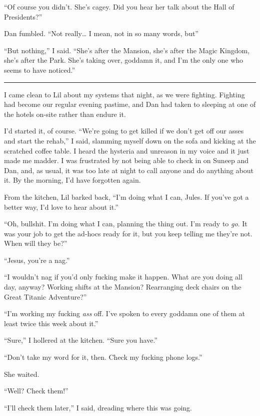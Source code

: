 “Of course you didn't. She's cagey. Did you hear her talk about the
Hall of Presidents?”

Dan fumbled. “Not really… I mean, not in so many words, but{\dash}”

“But nothing,” I said. “She's after the Mansion, she's after the
Magic Kingdom, she's after the Park. She's taking over, goddamn it,
and I'm the only one who seems to have noticed.”

\begin{center}\rule{1in}{0.4pt}\end{center}

I came clean to Lil about my systems that night, as we were
fighting. Fighting had become our regular evening pastime, and Dan
had taken to sleeping at one of the hotels on-site rather than
endure it.

I'd started it, of course. “We're going to get killed if we don't
get off our asses and start the rehab,” I said, slamming myself
down on the sofa and kicking at the scratched coffee table. I heard
the hysteria and unreason in my voice and it just made me madder. I
was frustrated by not being able to check in on Suneep and Dan,
and, as usual, it was too late at night to call anyone and do
anything about it. By the morning, I'd have forgotten again.

From the kitchen, Lil barked back, “I'm doing what I can, Jules. If
you've got a better way, I'd love to hear about it.”

“Oh, bullshit. I'm doing what I can, planning the thing out. I'm
ready to \emph{go}. It was your job to get the ad-hocs ready for
it, but you keep telling me they're not. When will they be?”

“Jesus, you're a nag.”

“I wouldn't nag if you'd only fucking make it happen. What are you
doing all day, anyway? Working shifts at the Mansion? Rearranging
deck chairs on the Great Titanic Adventure?”

“I'm working my fucking \emph{ass} off. I've spoken to every
goddamn one of them at least twice this week about it.”

“Sure,” I hollered at the kitchen. “Sure you have.”

“Don't take my word for it, then. Check my fucking phone logs.”

She waited.

“Well? Check them!”

“I'll check them later,” I said, dreading where this was going.

